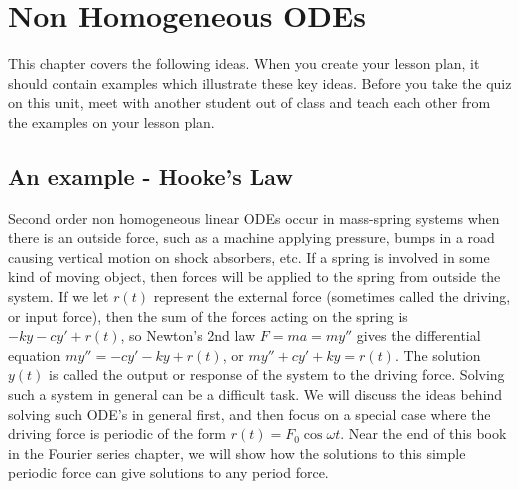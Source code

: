 
\chapter{Non Homogeneous ODEs}

This chapter covers the following ideas. When you create your lesson plan, it should contain examples which illustrate these key ideas. Before you take the quiz on this unit, meet with another student out of class and teach each other from the examples on your lesson plan. 





\section{An example - Hooke's Law}
Second order non homogeneous linear ODEs occur in mass-spring systems when there is an outside force, such as a machine applying pressure, bumps in a road causing vertical motion on shock absorbers, etc. If a spring is involved in some kind of moving object, then forces will be applied to the spring from outside the system. If we let $r(t)$ represent the external force (sometimes called the driving, or input force), then the sum of the forces acting on the spring is $-ky-cy'+r(t)$, so Newton's 2nd law $F=ma = my''$ gives the differential equation $my''=-cy'-ky+r(t)$, or $my''+cy'+ky=r(t)$.  The solution $y(t)$ is called the output or response of the system to the driving force.  Solving such a system in general can be a difficult task.  We will discuss the ideas behind solving such ODE's in general first, and then focus on a special case where the driving force is periodic of the form $r(t)=F_0\cos \omega t$. Near the end of this book in the Fourier series chapter, we will show how the solutions to this simple periodic force can give solutions to any period force. 

